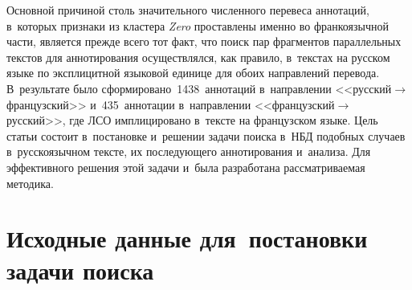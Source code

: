 \begin{multicols}{2}
   Основной причиной столь значительного чис\-лен\-но\-го перевеса аннотаций, в~которых признаки из кластера \textit{Zero} проставлены именно во 
франкоязычной части, является прежде всего тот факт, что поиск пар 
фрагментов параллельных текстов для аннотирования осуществлялся, как 
правило, в~текстах на русском языке по эксплицитной языковой единице для 
обоих направлений перевода. В~результате было 
сформировано~1438~аннотаций в~направлении  
<<рус\-ский\;$\to$\;фран\-цуз\-ский>> и~435~аннотации в~направлении 
<<фран\-цуз\-ский\;$\to$\;рус\-ский>>, где ЛСО имплицировано в~тексте на 
французском языке. Цель статьи состоит в~постановке и~решении задачи 
поиска в~НБД подобных случаев в~русскоязычном тексте, их последующего 
аннотирования и~анализа. Для эффективного решения этой задачи и~была 
разработана рассматриваемая методика.

\vspace*{-6pt}
   
\section{Исходные данные для~постановки задачи поиска}

\vspace*{-4pt}


\end{multicols}
